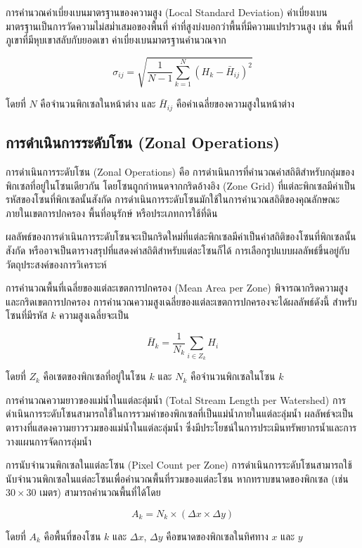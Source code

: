 \begin{ex}
การคำนวณค่าเบี่ยงเบนมาตรฐานของความสูง (Local Standard Deviation) ค่าเบี่ยงเบนมาตรฐานเป็นการวัดความไม่สม่ำเสมอของพื้นที่ ค่าที่สูงบ่งบอกว่าพื้นที่มีความแปรปรวนสูง เช่น พื้นที่ภูเขาที่มีหุบเขาสลับกับยอดเขา ค่าเบี่ยงเบนมาตรฐานคำนวณจาก

\[
\sigma_{ij} = \sqrt{ \frac{1}{N-1} \sum_{k=1}^{N} (H_k - \bar{H}_{ij})^2 }
\]

โดยที่ $N$ คือจำนวนพิกเซลในหน้าต่าง และ $\bar{H}_{ij}$ คือค่าเฉลี่ยของความสูงในหน้าต่าง
\end{ex}

\subsection{การดำเนินการระดับโซน (Zonal Operations)}

การดำเนินการระดับโซน (Zonal Operations) คือ การดำเนินการที่คำนวณค่าสถิติสำหรับกลุ่มของพิกเซลที่อยู่ในโซนเดียวกัน โดยโซนถูกกำหนดจากกริดอ้างอิง (Zone Grid) ที่แต่ละพิกเซลมีค่าเป็นรหัสของโซนที่พิกเซลนั้นสังกัด การดำเนินการระดับโซนมักใช้ในการคำนวณสถิติของคุณลักษณะภายในเขตการปกครอง พื้นที่อนุรักษ์ หรือประเภทการใช้ที่ดิน

ผลลัพธ์ของการดำเนินการระดับโซนจะเป็นกริดใหม่ที่แต่ละพิกเซลมีค่าเป็นค่าสถิติของโซนที่พิกเซลนั้นสังกัด หรืออาจเป็นตารางสรุปที่แสดงค่าสถิติสำหรับแต่ละโซนก็ได้ การเลือกรูปแบบผลลัพธ์ขึ้นอยู่กับวัตถุประสงค์ของการวิเคราะห์

\begin{ex}
การคำนวณพื้นที่เฉลี่ยของแต่ละเขตการปกครอง (Mean Area per Zone) พิจารณากริดความสูงและกริดเขตการปกครอง การคำนวณความสูงเฉลี่ยของแต่ละเขตการปกครองจะได้ผลลัพธ์ดังนี้ สำหรับโซนที่มีรหัส $k$ ความสูงเฉลี่ยจะเป็น

\[
\bar{H}_k = \frac{1}{N_k} \sum_{i \in Z_k} H_i
\]

โดยที่ $Z_k$ คือเซตของพิกเซลที่อยู่ในโซน $k$ และ $N_k$ คือจำนวนพิกเซลในโซน $k$
\end{ex}

\begin{ex}
การคำนวณความยาวของแม่น้ำในแต่ละลุ่มน้ำ (Total Stream Length per Watershed) การดำเนินการระดับโซนสามารถใช้ในการรวมค่าของพิกเซลที่เป็นแม่น้ำภายในแต่ละลุ่มน้ำ ผลลัพธ์จะเป็นตารางที่แสดงความยาวรวมของแม่น้ำในแต่ละลุ่มน้ำ ซึ่งมีประโยชน์ในการประเมินทรัพยากรน้ำและการวางแผนการจัดการลุ่มน้ำ
\end{ex}

\begin{ex}
การนับจำนวนพิกเซลในแต่ละโซน (Pixel Count per Zone) การดำเนินการระดับโซนสามารถใช้นับจำนวนพิกเซลในแต่ละโซนเพื่อคำนวณพื้นที่รวมของแต่ละโซน หากทราบขนาดของพิกเซล (เช่น $30 \times 30$ เมตร) สามารถคำนวณพื้นที่ได้โดย

\[
A_k = N_k \times (\Delta x \times \Delta y)
\]

โดยที่ $A_k$ คือพื้นที่ของโซน $k$ และ $\Delta x$, $\Delta y$ คือขนาดของพิกเซลในทิศทาง $x$ และ $y$
\end{ex}

